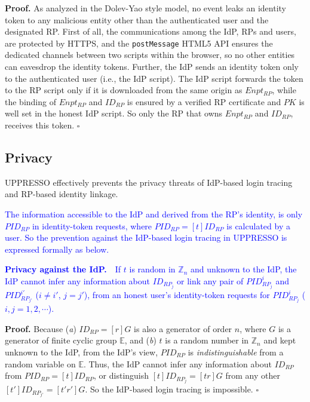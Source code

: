 \vspace{0.75mm}
\noindent\textbf{Proof.}
As analyzed in the Dolev-Yao style model, no event leaks an identity token to any malicious entity other than the authenticated user and the designated RP.
First of all, the communications among the IdP, RPs and users,
    are protected by HTTPS,
    and the \verb+postMessage+ HTML5 API ensures the dedicated channels between two scripts within the browser,
    so no other entities can eavesdrop the identity tokens.
Further, the IdP sends an identity token only to the authenticated user
        (i.e., the IdP script).
The IdP script forwards the token to the RP script
 only if it is downloaded from the same origin as $Enpt_{RP}$,
while the binding of $Enpt_{RP}$ and $ID_{RP}$ is ensured by a verified RP certificate
    and $PK$ is well set in the honest IdP script.
So only the RP that owns $Enpt_{RP}$ and $ID_{RP}$,
    receives this token. $\square$



\subsection{Privacy}
\label{sec-:analysis}
UPPRESSO effectively prevents the privacy threats of IdP-based login tracing and RP-based identity linkage.

\textcolor{blue}{The information accessible to the IdP and derived from the RP's identity,
    is only $PID_{RP}$ in identity-token requests, where $PID_{RP} = [t]ID_{RP}$ is calculated by a user.
So the prevention against the IdP-based login tracing in UPPRESSO
    is expressed formally as below.}

\vspace{1mm}
\noindent\textcolor{blue}{\textbf{Privacy against the IdP.}~~If $t$ is random in $\mathbb{Z}_n$ and unknown to the IdP,
the IdP
 cannot infer any information about $ID_{RP_j}$ or link any pair of $PID_{RP_j}^i$ and $PID_{RP_{j'}}^{i'}$
  ($i \neq i'$, $j = j'$),
    from an honest user's identity-token requests for $PID_{RP_j}^i$ ($i,j = 1, 2, \cdots$).}

\vspace{0.75mm}
\noindent\textbf{Proof.}
Because (\emph{a}) $ID_{RP} = [r]G$ is also a generator of order $n$,
        where $G$ is a generator of finite cyclic group $\mathbb{E}$,
    and (\emph{b}) $t$ is a random number in $\mathbb{Z}_n$ and kept unknown to the IdP,
 from the IdP's view,
 $PID_{RP}$
is \emph{indistinguishable} from a random variable on $\mathbb{E}$.
Thus,
    the IdP cannot infer any information about $ID_{RP}$ from $PID_{RP} = [t]ID_{RP}$,
or distinguish $[t]ID_{RP_j} = [tr]G$ from any other $[t']ID_{RP_{j'}} = [t'r']G$.
So the IdP-based login tracing is impossible. $\square$

